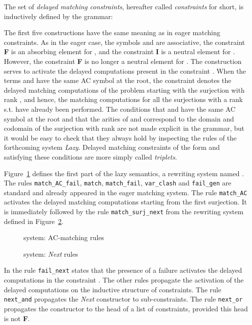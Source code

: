 \documentclass[submission,copyright,creativecommons]{eptcs}
\numberwithin{subcase}{case}
\begin{document}
\begin{definition}
The set of \emph{delayed matching
constraints}, hereafter called \emph{constraints} for short, is inductively
defined by the grammar: 
\end{definition} 
The first five constructions have the same meaning as in eager matching
constraints. As in the eager case, the symbols  and  are
associative, the constraint \textbf{F} is an absorbing element for , and
the constraint \textbf{I} is a neutral element for  . However,  the
constraint \textbf{F} is no longer a neutral element for .
 The construction  serves to activate the delayed computations
 present in the constraint .
 When the terms  and  have the same AC symbol at the root, the constraint
  denotes
the delayed matching computations of the problem  starting with
the surjection 
with rank , and hence, the matching computations for all the
surjections 
with a rank  s.t.  have already been performed. The conditions
that  and  have the same AC symbol at the root and that the arities of 
and  correspond to the domain and codomain of 
the surjection with rank  are not made
explicit in the grammar, but it would be easy to check that they always hold by
inspecting the rules of the forthcoming system \emph{Lazy}.
Delayed matching constraints of the form  and satisfying these
conditions are more simply called \emph{triplets}.


Figure~\ref{Matching-AC} defines the first part of the lazy
semantics, a rewriting system named .
The rules \texttt{match\_AC\_fail}, \texttt{match},  \texttt{match\_fail}, 
 \texttt{var\_clash} and \texttt{fail\_gen} are standard and
already appeared  in the eager matching system.
The rule \texttt{match\_AC} activates the delayed matching computations starting from 
the first surjection. It is immediately followed by the rule
\texttt{match\_surj\_next} from the rewriting system  defined in
Figure~\ref{Next}.
 

\begin{figure}[htb!]

\caption{ system: AC-matching rules \label{Matching-AC}}
\end{figure}


\begin{figure}[hbt!]

\caption{ system: \textit{Next} rules \label{Next}}
\end{figure}
In  the rule \texttt{fail\_next} states that the presence of a
failure activates the delayed computations in the constraint . The other rules
propagate the activation of the delayed computations on the inductive structure
of constraints. The rule \texttt{next\_and}
 propagates the \textit{Next} constructor to sub-constraints. The rule
 \texttt{next\_or} propagates the  constructor to the
 head of a list of constraints, provided this head is not \textbf{F}.
\end{document}
